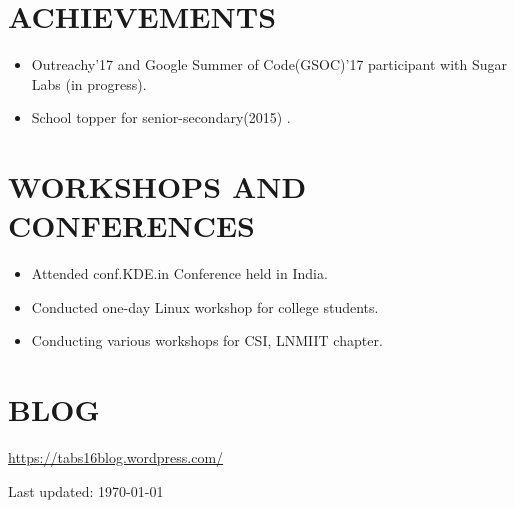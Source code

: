 \documentclass[margin]{res}
\begin{document}
\begin{resume}
\section{ACHIEVEMENTS}
	\begin{itemize}
		\item Outreachy'17 and Google Summer of Code(GSOC)'17 participant with Sugar Labs (in progress). 
		\item School topper for senior-secondary(2015) .
	\end{itemize}

\section{WORKSHOPS AND CONFERENCES}
	
	\begin{itemize}
		\item Attended conf.KDE.in Conference held in India.
		\item Conducted one-day Linux workshop for college students.
		\item Conducting various workshops for CSI, LNMIIT chapter.
\end{itemize} 

\section{BLOG}
\url{https://tabs16blog.wordpress.com/}

 
\begin{center}
  \begin{footnotesize}
    Last updated: \today \\
  \end{footnotesize}
\end{center}

\end{resume}
\end{document}
